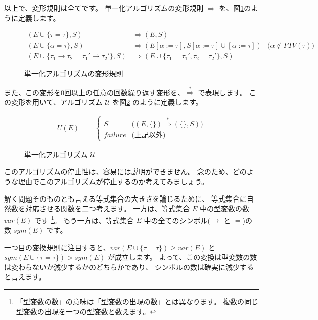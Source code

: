 以上で、変形規則は全てです。
単一化アルゴリズムの変形規則 $\Longrightarrow$ を、図\ref{fig:unification-trans}のように定義します。

\begin{figure}[htbp]
  \begin{align*}
    (E \cup \{\tau = \tau\}, S)
      &\Longrightarrow (E, S) \\
    (E \cup \{\alpha = \tau\}, S)
      &\Longrightarrow (E[\alpha := \tau], S[\alpha := \tau] \cup [\alpha := \tau])
      &\text{($\alpha \notin \mathit{FTV(\tau)}$)}\\
    (E \cup \{\tau_1 \to \tau_2 = \tau_1' \to \tau_2'\}, S)
      &\Longrightarrow (E \cup \{\tau_1 = \tau_1', \tau_2 = \tau_2'\}, S)
  \end{align*}
  \caption{単一化アルゴリズムの変形規則}
  \label{fig:unification-trans}
\end{figure}

また、この変形を0回以上の任意の回数繰り返す変形を、$\stackrel{*}{\Longrightarrow}$ で表現します。
この変形を用いて、アルゴリズム $\mathcal U$ を図\ref{fig:algorithm-u} のように定義します。

\begin{figure}[htbp]
  \begin{align*}
    U(E) &=
    \begin{cases}
      S & \text{($(E, \{\}) \stackrel{*}{\Longrightarrow} (\{\}, S)$)} \\
      \mathit{failure} & \text{(上記以外)}
    \end{cases}
  \end{align*}
  \caption{単一化アルゴリズム $\mathcal U$}
  \label{fig:algorithm-u}
\end{figure}

このアルゴリズムの停止性は、容易には説明ができません。
念のため、どのような理由でこのアルゴリズムが停止するのか考えてみましょう。

解く問題そのものとも言える等式集合の大きさを論じるために、
等式集合に自然数を対応させる関数を二つ考えます。
一方は、等式集合 $E$ 中の型変数の数 $\mathit{var}(E)$ です
\footnote{「型変数の数」の意味は「型変数の出現の数」とは異なります。
複数の同じ型変数の出現を一つの型変数と数えます。}。
もう一方は、等式集合 $E$ 中の全てのシンボル($\to$ と $=$)の数 $\mathit{sym}(E)$ です。

一つ目の変換規則に注目すると、$\mathit{var}(E \cup \{\tau = \tau\}) \ge \mathit{var}(E)$ と
$\mathit{sym}(E \cup \{\tau = \tau\}) > \mathit{sym}(E)$ が成立します。
よって、この変換は型変数の数は変わらないか減少するかのどちらかであり、
シンボルの数は確実に減少すると言えます。

